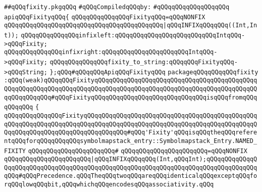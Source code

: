 \label{src/lib/compiler/front/basics/map/fixity.pkg}
\verb|##qQQqfixity.pkgqQQq|\newline
\newline
\verb|#qQQqCompiledqQQqby:|\newline
\verb|#qQQqqQQqqQQqqQQqqQQq|\newline
\newline
\verb|apiqQQqFixityqQQq{|\newline
\newline
\verb|qQQqqQQqqQQqqQQqFixityqQQq=qQQqNONFIX|\newline
\verb|qQQqqQQqqQQqqQQqqQQqqQQqqQQqqQQqqQQqqQQqqQQq|\verb#|qQQqINFIXqQQqqQQq((Int,Int));#\newline
\newline
\verb|qQQqqQQqqQQqqQQqinfixleft:qQQqqQQqqQQqqQQqqQQqqQQqqQQqIntqQQq->qQQqFixity;|\newline
\verb|qQQqqQQqqQQqqQQqinfixright:qQQqqQQqqQQqqQQqqQQqqQQqIntqQQq->qQQqFixity;|\newline
\newline
\verb|qQQqqQQqqQQqqQQqfixity_to_string:qQQqqQQqFixityqQQq->qQQqString;|\newline
\newline
\verb|};qQQq#qQQqqQQqApiqQQqFixityqQQq|\newline
\newline
\newline
\verb|packageqQQqqQQqqQQqfixity|\newline
\verb|:qQQq(weak)qQQqqQQqFixityqQQqqQQqqQQqqQQqqQQqqQQqqQQqqQQqqQQqqQQqqQQqqQQqqQQqqQQqqQQqqQQqqQQqqQQqqQQqqQQqqQQqqQQqqQQqqQQqqQQqqQQqqQQqqQQqqQQqqQQqqQQqqQQq#qQQqFixityqQQqqQQqqQQqqQQqqQQqqQQqqQQqqQQqisqQQqfromqQQqqQQqqQQq|\newline
\verb|{|\newline
\verb|qQQqqQQqqQQqqQQqFixityqQQqqQQqqQQqqQQqqQQqqQQqqQQqqQQqqQQqqQQqqQQqqQQqqQQqqQQqqQQqqQQqqQQqqQQqqQQqqQQqqQQqqQQqqQQqqQQqqQQqqQQqqQQqqQQqqQQqqQQqqQQqqQQqqQQqqQQqqQQqqQQqqQQqqQQq#qQQq'Fixity'qQQqisqQQqtheqQQqreferentqQQqforqQQqqQQqqQQqsymbolmapstack_entry::Symbolmapstack_Entry.NAMED_FIXITY|\newline
\verb|qQQqqQQqqQQqqQQqqQQqqQQq#|\newline
\verb|qQQqqQQqqQQqqQQqqQQqqQQq=qQQqNONFIX|\newline
\verb|qQQqqQQqqQQqqQQqqQQqqQQq|\verb#|qQQqINFIXqQQqqQQq(Int,qQQqInt);qQQqqQQqqQQqqQQqqQQqqQQqqQQqqQQqqQQqqQQqqQQqqQQqqQQqqQQqqQQqqQQqqQQqqQQqqQQqqQQqqQQqqQQq#\verb|#qQQqPrecedence.qQQqTheqQQqtwoqQQqareqQQqidenticalqQQqexceptqQQqforqQQqlowqQQqbit,qQQqwhichqQQqencodesqQQqassociativity.qQQq|\newline
